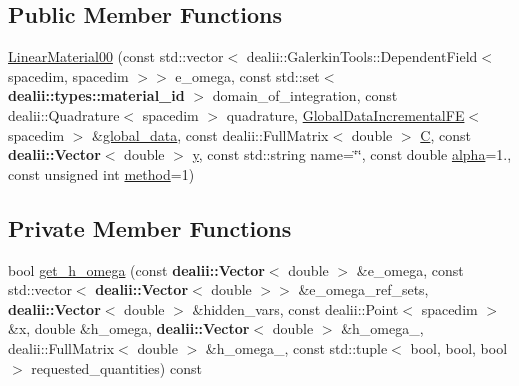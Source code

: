 \subsection*{Public Member Functions}
\begin{DoxyCompactItemize}
\item 
\hyperlink{classincremental_f_e_1_1_linear_material00_3_01spacedim_00_01spacedim_01_4_af81752439b647eb209fa75c78c73916d}{Linear\+Material00} (const std\+::vector$<$ dealii\+::\+Galerkin\+Tools\+::\+Dependent\+Field$<$ spacedim, spacedim $>$$>$ e\+\_\+omega, const std\+::set$<$ {\bf dealii\+::types\+::material\+\_\+id} $>$ domain\+\_\+of\+\_\+integration, const dealii\+::\+Quadrature$<$ spacedim $>$ quadrature, \hyperlink{classincremental_f_e_1_1_global_data_incremental_f_e}{Global\+Data\+Incremental\+FE}$<$ spacedim $>$ \&\hyperlink{classincremental_f_e_1_1_linear_material00_3_01spacedim_00_01spacedim_01_4_a4dd0b5104cb011bc4c2757c82aad7b24}{global\+\_\+data}, const dealii\+::\+Full\+Matrix$<$ double $>$ \hyperlink{classincremental_f_e_1_1_linear_material00_3_01spacedim_00_01spacedim_01_4_a73536564b0df52fe76ec1c14b9dbe116}{C}, const {\bf dealii\+::\+Vector}$<$ double $>$ \hyperlink{classincremental_f_e_1_1_linear_material00_3_01spacedim_00_01spacedim_01_4_a98fe1a6dd427e3bf9fe416b9525d2725}{y}, const std\+::string name=\char`\"{}\char`\"{}, const double \hyperlink{classincremental_f_e_1_1_linear_material00_3_01spacedim_00_01spacedim_01_4_a12c7da528cdd260b6a09bd9e66213781}{alpha}=1., const unsigned int \hyperlink{classincremental_f_e_1_1_linear_material00_3_01spacedim_00_01spacedim_01_4_aa8c59701106680d7d5e474674f1a5b00}{method}=1)
\end{DoxyCompactItemize}
\subsection*{Private Member Functions}
\begin{DoxyCompactItemize}
\item 
bool \hyperlink{classincremental_f_e_1_1_linear_material00_3_01spacedim_00_01spacedim_01_4_a510db8d1b239c9f44edda07b9beaa473}{get\+\_\+h\+\_\+omega} (const {\bf dealii\+::\+Vector}$<$ double $>$ \&e\+\_\+omega, const std\+::vector$<$ {\bf dealii\+::\+Vector}$<$ double $>$$>$ \&e\+\_\+omega\+\_\+ref\+\_\+sets, {\bf dealii\+::\+Vector}$<$ double $>$ \&hidden\+\_\+vars, const dealii\+::\+Point$<$ spacedim $>$ \&x, double \&h\+\_\+omega, {\bf dealii\+::\+Vector}$<$ double $>$ \&h\+\_\+omega\+\_, dealii\+::\+Full\+Matrix$<$ double $>$ \&h\+\_\+omega\+\_, const std\+::tuple$<$ bool, bool, bool $>$ requested\+\_\+quantities) const 
\end{DoxyCompactItemize}
